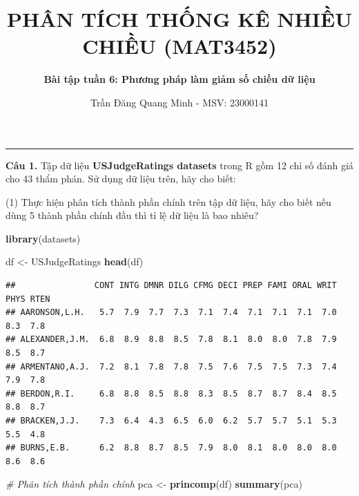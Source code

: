 \documentclass[
]{article}
\title{\textbf{PHÂN TÍCH THỐNG KÊ NHIỀU CHIỀU (MAT3452)}}
\author{\textbf{Bài tập tuần 6: Phương pháp làm giảm số chiều dữ liệu}}
\date{Trần Đăng Quang Minh - MSV: 23000141}
\newenvironment{Shaded}{\begin{snugshade}}{\end{snugshade}}
\newcommand{\CommentTok}[1]{\textcolor[rgb]{0.56,0.35,0.01}{\textit{#1}}}
\newcommand{\FunctionTok}[1]{\textcolor[rgb]{0.13,0.29,0.53}{\textbf{#1}}}
\newcommand{\NormalTok}[1]{#1}
\newcommand{\OtherTok}[1]{\textcolor[rgb]{0.56,0.35,0.01}{#1}}
\begin{document}
\maketitle

\begin{center}\rule{0.5\linewidth}{0.5pt}\end{center}

\textbf{Câu 1. } Tập dữ liệu \textbf{USJudgeRatings {datasets}} trong R
gồm 12 chỉ số đánh giá cho 43 thẩm phán. Sử dụng dữ liệu trên, hãy cho
biết:

\hfill\break
(1) Thực hiện phân tích thành phần chính trên tập dữ liệu, hãy cho biết
nếu dùng 5 thành phần chính đầu thì tỉ lệ dữ liệu là bao nhiêu?

\begin{Shaded}
\begin{Highlighting}[]
\FunctionTok{library}\NormalTok{(datasets)}

\NormalTok{df }\OtherTok{\textless{}{-}}\NormalTok{ USJudgeRatings}
\FunctionTok{head}\NormalTok{(df)}
\end{Highlighting}
\end{Shaded}

\begin{verbatim}
##                CONT INTG DMNR DILG CFMG DECI PREP FAMI ORAL WRIT PHYS RTEN
## AARONSON,L.H.   5.7  7.9  7.7  7.3  7.1  7.4  7.1  7.1  7.1  7.0  8.3  7.8
## ALEXANDER,J.M.  6.8  8.9  8.8  8.5  7.8  8.1  8.0  8.0  7.8  7.9  8.5  8.7
## ARMENTANO,A.J.  7.2  8.1  7.8  7.8  7.5  7.6  7.5  7.5  7.3  7.4  7.9  7.8
## BERDON,R.I.     6.8  8.8  8.5  8.8  8.3  8.5  8.7  8.7  8.4  8.5  8.8  8.7
## BRACKEN,J.J.    7.3  6.4  4.3  6.5  6.0  6.2  5.7  5.7  5.1  5.3  5.5  4.8
## BURNS,E.B.      6.2  8.8  8.7  8.5  7.9  8.0  8.1  8.0  8.0  8.0  8.6  8.6
\end{verbatim}

\begin{Shaded}
\begin{Highlighting}[]
\CommentTok{\# Phân tích thành phần chính}
\NormalTok{pca }\OtherTok{\textless{}{-}} \FunctionTok{princomp}\NormalTok{(df)}
\FunctionTok{summary}\NormalTok{(pca)}
\end{Highlighting}
\end{Shaded}
\end{document}
